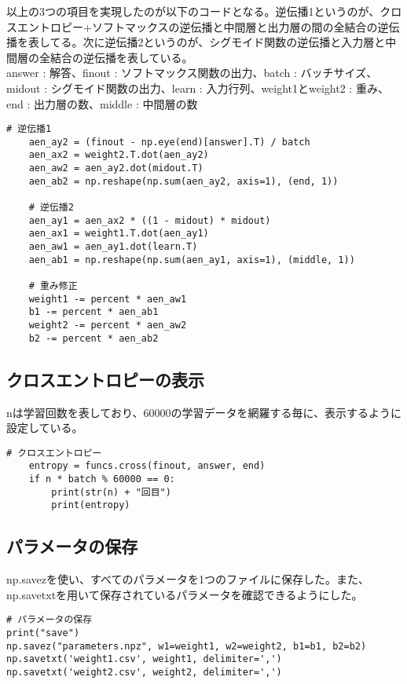 \documentclass{ujarticle}
\begin{document}
以上の3つの項目を実現したのが以下のコードとなる。逆伝播1というのが、クロスエントロピー+ソフトマックスの逆伝播と中間層と出力層の間の全結合の逆伝播を表してる。次に逆伝播2というのが、シグモイド関数の逆伝播と入力層と中間層の全結合の逆伝播を表している。\\
answer : 解答、finout : ソフトマックス関数の出力、batch : バッチサイズ、midout : シグモイド関数の出力、learn : 入力行列、weight1とweight2 : 重み、end : 出力層の数、middle : 中間層の数
\begin{lstlisting}[basicstyle=\ttfamily\footnotesize, frame=single]
    # 逆伝播1
    aen_ay2 = (finout - np.eye(end)[answer].T) / batch
    aen_ax2 = weight2.T.dot(aen_ay2)
    aen_aw2 = aen_ay2.dot(midout.T)
    aen_ab2 = np.reshape(np.sum(aen_ay2, axis=1), (end, 1))

    # 逆伝播2
    aen_ay1 = aen_ax2 * ((1 - midout) * midout)
    aen_ax1 = weight1.T.dot(aen_ay1)
    aen_aw1 = aen_ay1.dot(learn.T)
    aen_ab1 = np.reshape(np.sum(aen_ay1, axis=1), (middle, 1))

    # 重み修正
    weight1 -= percent * aen_aw1
    b1 -= percent * aen_ab1
    weight2 -= percent * aen_aw2
    b2 -= percent * aen_ab2
\end{lstlisting}

\subsection{クロスエントロピーの表示}
nは学習回数を表しており、60000の学習データを網羅する毎に、表示するように設定している。
\begin{lstlisting}[basicstyle=\ttfamily\footnotesize, frame=single]
# クロスエントロピー
    entropy = funcs.cross(finout, answer, end)
    if n * batch % 60000 == 0:
        print(str(n) + "回目")
        print(entropy)
\end{lstlisting}

\subsection{パラメータの保存}
np.savezを使い、すべてのパラメータを1つのファイルに保存した。また、np.savetxtを用いて保存されているパラメータを確認できるようにした。
\begin{lstlisting}[basicstyle=\ttfamily\footnotesize, frame=single]
# パラメータの保存
print("save")
np.savez("parameters.npz", w1=weight1, w2=weight2, b1=b1, b2=b2)
np.savetxt('weight1.csv', weight1, delimiter=',')
np.savetxt('weight2.csv', weight2, delimiter=',')
\end{lstlisting}
\end{document}
